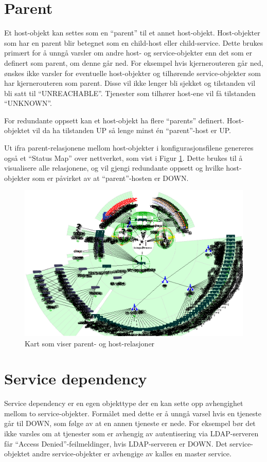 \section{Parent}\label{sec:parent}
Et host-objekt kan settes som en ``parent'' til et annet host-objekt. Host-objekter som har en parent blir betegnet som en child-host eller child-service. Dette brukes primært for å unngå varsler om andre host- og service-objekter enn det som er definert som parent, om denne går ned. For eksempel hvis kjernerouteren går ned, ønskes ikke varsler for eventuelle host-objekter og tilhørende service-objekter som har kjernerouteren som parent. Disse vil ikke lenger bli sjekket og tilstanden vil bli satt til ``UNREACHABLE''. Tjenester som tilhører host-ene vil få tilstanden ``UNKNOWN''.

For redundante oppsett kan et host-objekt ha flere ``parents'' definert. Host-objektet vil da ha tilstanden UP så lenge minst én ``parent''-host er UP.

Ut ifra parent-relasjonene mellom host-objekter i konfigurasjonsfilene genereres også et ``Status Map'' over nettverket, som vist i Figur \ref{statusmap}. Dette brukes til å visualisere alle relasjonene, og vil gjengi redundante oppsett og hvilke host-objekter som er påvirket av at ``parent''-hosten er DOWN.

\begin{figure}[H]
    \centering
    \includegraphics[scale=0.6]{img/statusmap}
    \caption{Kart som viser parent- og host-relasjoner}
    \label{statusmap}
\end{figure}

\section{Service dependency}\label{sec:servicedependency}
Service dependency er en egen objekttype der en kan sette opp avhengighet mellom to service-objekter. Formålet med dette er å unngå varsel hvis en tjeneste går til DOWN, som følge av at en annen tjeneste er nede. For eksempel bør det ikke varsles om at tjenester som er avhengig av autentisering via LDAP-serveren får ``Access Denied''-feilmeldinger, hvis LDAP-serveren er DOWN. Det service-objektet andre service-objekter er avhengige av kalles en master service. 

